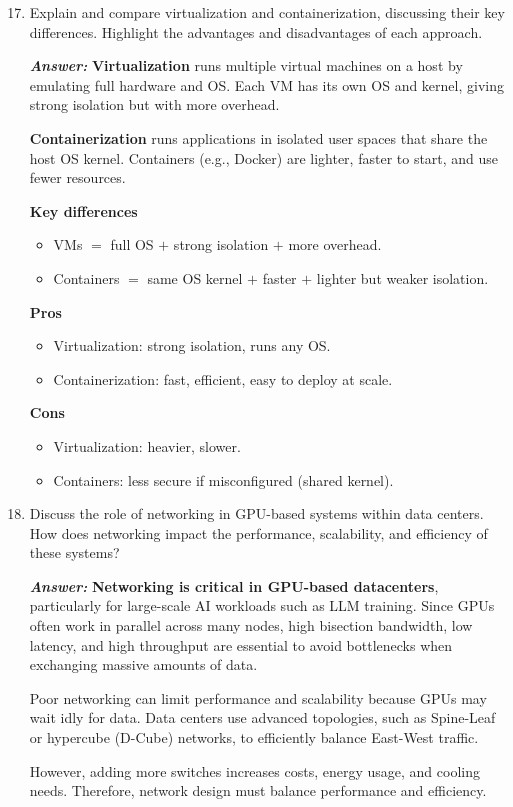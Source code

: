 \begin{enumerate}
    \setcounter{enumi}{16}

    \item Explain and compare virtualization and containerization, discussing their key differences. Highlight the advantages and disadvantages of each approach.

    \textcolor{Green3}{\textbf{\emph{Answer:}}} \textbf{Virtualization} runs multiple virtual machines on a host by emulating full hardware and OS. Each VM has its own OS and kernel, giving strong isolation but with more overhead.

    \textbf{Containerization} runs applications in isolated user spaces that share the host OS kernel. Containers (e.g., Docker) are lighter, faster to start, and use fewer resources.

    \textbf{Key differences}
    \begin{itemize}
        \item VMs $=$ full OS $+$ strong isolation $+$ more overhead.
        \item Containers $=$ same OS kernel $+$ faster $+$ lighter but weaker isolation.
    \end{itemize}

    \textbf{Pros}
    \begin{itemize}
        \item Virtualization: strong isolation, runs any OS.
        \item Containerization: fast, efficient, easy to deploy at scale.
    \end{itemize}

    \textbf{Cons}
    \begin{itemize}
        \item Virtualization: heavier, slower.
        \item Containers: less secure if misconfigured (shared kernel).
    \end{itemize}


    \item Discuss the role of networking in GPU-based systems within data centers. How does networking impact the performance, scalability, and efficiency of these systems?

    \textcolor{Green3}{\textbf{\emph{Answer:}}} \textbf{Networking is critical in GPU-based datacenters}, particularly for large-scale AI workloads such as LLM training. Since GPUs often work in parallel across many nodes, high bisection bandwidth, low latency, and high throughput are essential to avoid bottlenecks when exchanging massive amounts of data.

    Poor networking can limit performance and scalability because GPUs may wait idly for data. Data centers use advanced topologies, such as Spine-Leaf or hypercube (D-Cube) networks, to efficiently balance East-West traffic.

    However, adding more switches increases costs, energy usage, and cooling needs. Therefore, network design must balance performance and efficiency.
\end{enumerate}